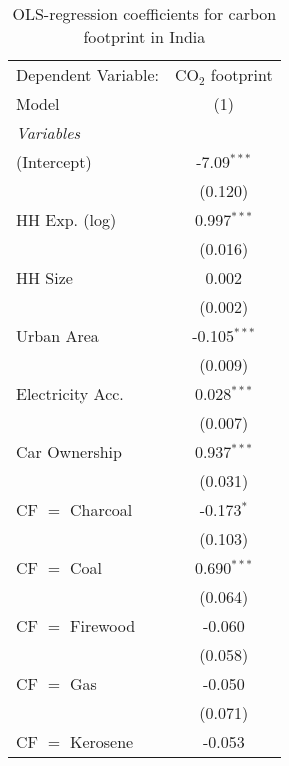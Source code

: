 
\begin{table}[htbp!]
   \centering
   \small
   \begin{adjustbox}{width = 1\textwidth, max height = 0.95\textheight, center}
      \begin{threeparttable}[b]
         \caption{\label{tab:OLS_2_IND} OLS-regression coefficients for carbon footprint in India}
         \begin{tabular}{lc}
            \tabularnewline \midrule \midrule
            Dependent Variable: & CO$_{2}$ footprint\\  
            Model               & (1)\\  
            \midrule
            \emph{Variables}\\
            (Intercept)         & -7.09$^{***}$\\   
                                & (0.120)\\   
            HH Exp. (log)       & 0.997$^{***}$\\   
                                & (0.016)\\   
            HH Size             & 0.002\\   
                                & (0.002)\\   
            Urban Area          & -0.105$^{***}$\\   
                                & (0.009)\\   
            Electricity Acc.    & 0.028$^{***}$\\   
                                & (0.007)\\   
            Car Ownership       & 0.937$^{***}$\\   
                                & (0.031)\\   
            CF $=$ Charcoal     & -0.173$^{*}$\\   
                                & (0.103)\\   
            CF $=$ Coal         & 0.690$^{***}$\\   
                                & (0.064)\\   
            CF $=$ Firewood     & -0.060\\   
                                & (0.058)\\   
            CF $=$ Gas          & -0.050\\   
                                & (0.071)\\   
            CF $=$ Kerosene     & -0.053\\   

\end{tabular}
\end{threeparttable}
\end{adjustbox}
\end{table}
